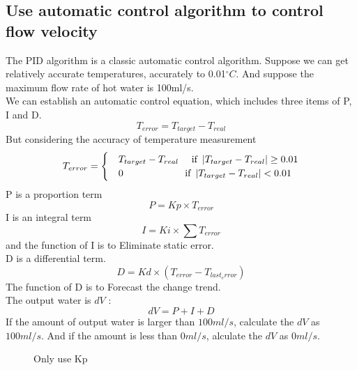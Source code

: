 \documentclass{mcmthesis}
\begin{document}
\subsection{Use automatic control algorithm to control flow velocity}
The PID algorithm is a classic automatic control algorithm. Suppose we can get relatively accurate temperatures, accurately to 0.01$^{\circ}C$. And suppose the maximum flow rate of hot water is 100ml/s.\\
\indent We can establish an automatic control equation, which includes three items of P, I and D.\\
\begin{equation}
T_{error}=T_{target}-T_{real}
\end{equation}
\indent But considering the accuracy of temperature measurement\\
\begin{equation}
	T_{error}=\begin{cases}
	&T_{target}-T_{real} \quad\text{ if }\left | T_{target}-T_{real} \right |\geq 0.01 \\ 
	&0\indent\indent\indent\indent \text{ if } \left | T_{target}-T_{real} \right |<0.01 
	\end{cases}
\end{equation}
\indent P is a proportion term
\begin{equation}
	P=Kp\times T_{error}
\end{equation}
\indent I is an integral term
\begin{equation}
	I=Ki\times \sum T_{error}
\end{equation}
and the function of I is to Eliminate static error.\\
\indent D is a differential term.
\begin{equation}
D=Kd\times (T_{error}-T_{last_error})
\end{equation}
\indent The function of D is to Forecast the change trend.\\
\indent The output water is $dV$ :
\begin{equation}
	dV=P+I+D
\end{equation}
\indent If the amount of output water is larger than $100ml/s$, calculate the $dV$ as $100ml/s$. And if the amount is less than $0ml/s$, alculate the $dV$ as $0ml/s$.
\begin{figure}[H]
\centering
{}
\caption{Only use Kp}
\label{PID1}
\end{figure}
\end{document}
